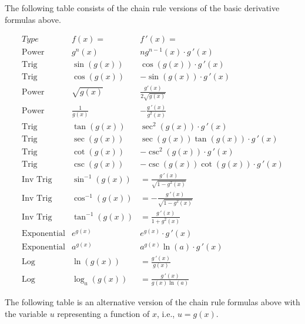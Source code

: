 \documentclass[handout]{ximera}
\begin{document}
The following table consists of the chain rule versions of the basic derivative formulas above.

\begin{center}
\[
\begin{array}{c|c|c}
		Type & f(x)= & f\,'(x)=  \\
		\hline
		\text{Power} & g^n(x) & ng^{n-1}(x)\cdot g\,'(x)  \\[8pt]
		\hline
		\text{Trig} & \sin\left(g(x)\right) & \cos\left(g(x)\right) \cdot g\,'(x) \\[8pt]
		\text{Trig} & \cos\left(g(x)\right) & -\sin\left(g(x)\right)\cdot g\,'(x)  \\[8pt]
		\hline
		\text{Power} & \sqrt{g(x)} & \displaystyle \frac{g'(x)}{2\sqrt {g(x)}}\\[8pt]
		\text{Power} & \displaystyle \frac{1}{g(x)} & -\displaystyle \frac{g\,'(x)}{g^2(x)}\\[8pt]
	  \hline
	  \text{Trig} & \tan\left(g(x)\right) & \sec^2\left(g(x)\right) \cdot g\,'(x) \\[8pt]
		\text{Trig} & \sec\left(g(x)\right) & \sec\left(g(x)\right)\tan\left(g(x)\right) \cdot g\,'(x) \\[8pt]
		\hline
		\text{Trig} & \cot\left(g(x)\right) & -\csc^2\left(g(x)\right) \cdot g\,'(x)  \\[8pt]
		\text{Trig} & \csc\left(g(x)\right) & -\csc\left(g(x)\right)\cot\left(g(x)\right) \cdot g\,'(x)  \\[8pt]
		\hline
		\text{Inv Trig} & \sin^{-1}\left(g(x)\right) &  = \displaystyle \frac{g\,'(x)}{\sqrt{1-g^2(x)}}  \\[8pt]
		\text{Inv Trig} & \cos^{-1}\left(g(x)\right) &  = \displaystyle -\frac{g\,'(x)}{\sqrt{1-g^2(x)}}\\[8pt]
		\text{Inv Trig} & \tan^{-1}\left(g(x)\right) &  = \displaystyle \frac{g\,'(x)}{1+g^2(x)} \\[8pt]
		\hline
		\text{Exponential} & e^{g(x)} & e^{g(x)} \cdot g\,'(x) \\[8pt]
		\text{Exponential} & a^{g(x)} & a^{g(x)}\ln(a) \cdot g\,'(x) \\[8pt]
		\hline
		\text{Log} & \ln\left(g(x)\right) &  = \displaystyle \frac{g\,'(x)}{g(x)} \\[8pt]
		\text{Log} & \log_a\left(g(x)\right) &  = \displaystyle \frac{g\,'(x)}{g(x)\ln(a)}
	\end{array}
    \]
\end{center}


The following table is an alternative version of the chain rule formulas above 
with the variable $u$ representing a function of $x$, i.e., $u = g(x)$.
\end{document}
